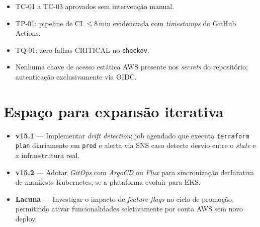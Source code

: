 \begin{itemize}[leftmargin=*]
  \item TC-01 a TC-03 aprovados sem interven\c{c}\~ao manual.
  \item TP-01: pipeline de CI $\leq 8$\,min evidenciada com
        \textit{timestamps} do GitHub Actions.
  \item TQ-01: zero falhas CRITICAL no \texttt{checkov}.
  \item Nenhuma chave de acesso est\'atica AWS presente nos
        \textit{secrets} do reposit\'orio; autentica\c{c}\~ao
        exclusivamente via OIDC.
\end{itemize}

\section{Espa\c{c}o para expans\~ao iterativa}

\begin{itemize}[leftmargin=*]
  \item \textbf{v15.1} --- Implementar \textit{drift detection}:
        job agendado que executa \texttt{terraform plan} diariamente em
        \texttt{prod} e alerta via SNS caso detecte desvio
        entre o \textit{state} e a infraestrutura real.
  \item \textbf{v15.2} --- Adotar \textit{GitOps} com
        \textit{ArgoCD} ou \textit{Flux} para sincroniza\c{c}\~ao
        declarativa de manifests Kubernetes, se a plataforma evoluir
        para EKS.
  \item \textbf{Lacuna} --- Investigar o impacto de \textit{feature flags}
        no ciclo de promo\c{c}\~ao, permitindo ativar funcionalidades
        seletivamente por conta AWS sem novo deploy.
\end{itemize}
